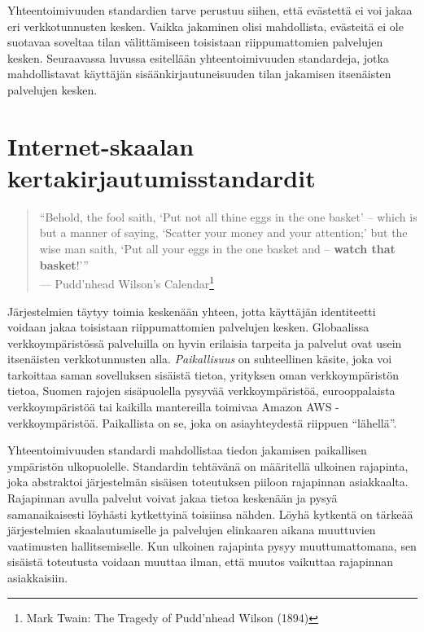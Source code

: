 \documentclass[finnish,gradu]{tktltiki}
\begin{document}
  Yhteentoimivuuden standardien tarve perustuu siihen, että evästettä ei voi jakaa eri verkkotunnusten kesken. Vaikka jakaminen olisi mahdollista, evästeitä ei ole suotavaa soveltaa tilan välittämiseen toisistaan riippumattomien palvelujen kesken. Seuraavassa luvussa esitellään yhteentoimivuuden standardeja, jotka mahdollistavat käyttäjän sisäänkirjautuneisuuden tilan jakamisen itsenäisten palvelujen kesken.





\newpage
\section{Internet-skaalan kertakirjautumisstandardit} %
\label{sec:Kertakirjautumisstandardit}
  \begin{quote}
      ``Behold, the fool saith, `Put not all thine eggs in the one basket'
      -- which is but a manner of saying, `Scatter your money and your attention;'
      but the wise man saith, `Put all your eggs in the one basket and -- \textbf{watch that basket}!'''
      \\--- Pudd'nhead Wilson's Calendar\footnote{
        Mark Twain: The Tragedy of Pudd'nhead Wilson (1894)
      }
  \end{quote}

  Järjestelmien täytyy toimia keskenään yhteen, jotta käyttäjän identiteetti voidaan jakaa toisistaan riippumattomien palvelujen kesken. Globaalissa verkkoympäristössä palveluilla on hyvin erilaisia tarpeita ja palvelut ovat usein itsenäisten verkkotunnusten alla. \emph{Paikallisuus} on suhteellinen käsite, joka voi tarkoittaa saman sovelluksen sisäistä tietoa, yrityksen oman verkkoympäristön tietoa, Suomen rajojen sisäpuolella pysyvää verkkoympäristöä, eurooppalaista verkkoympäristöä tai kaikilla mantereilla toimivaa Amazon AWS -verkkoympäristöä. Paikallista on se, joka on asiayhteydestä riippuen ``lähellä''.

  Yhteentoimivuuden standardi mahdollistaa tiedon jakamisen paikallisen ympäristön ulkopuolelle. Standardin tehtävänä on määritellä ulkoinen rajapinta, joka abstraktoi järjestelmän sisäisen toteutuksen piiloon rajapinnan asiakkaalta. Rajapinnan avulla palvelut voivat jakaa tietoa keskenään ja pysyä samanaikaisesti löyhästi kytkettyinä toisiinsa nähden. Löyhä kytkentä on tärkeää järjestelmien skaalautumiselle ja palvelujen elinkaaren aikana muuttuvien vaatimusten hallitsemiselle. Kun ulkoinen rajapinta pysyy muuttumattomana, sen sisäistä toteutusta voidaan muuttaa ilman, että muutos vaikuttaa rajapinnan asiakkaisiin.
\end{document}
